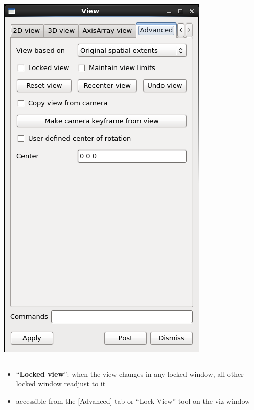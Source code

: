 \begin{frame}
\begin{columns}[T]
\begin{column}{3cm}
	\includegraphics[width=.9\columnwidth]{figs/visit-guis/visit_viewAdv}
\end{column}
\end{columns}

\begin{itemize}
	\item ``\textbf{Locked view}'': when the view changes in any locked window, all other locked window readjust to it
	\item accessible from the [Advanced] tab or ``Lock View'' tool on the viz-window
\end{itemize}

\end{frame}


